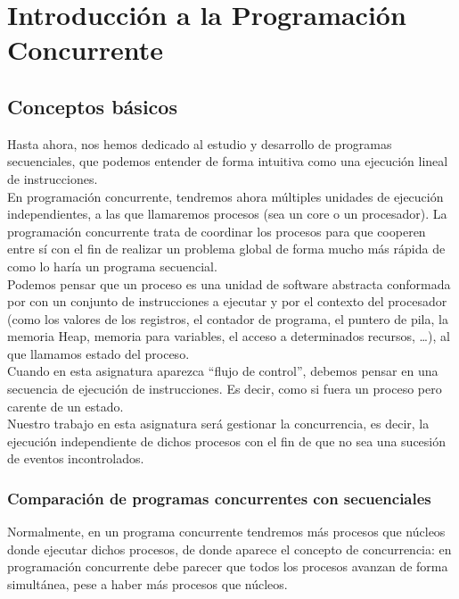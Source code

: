 \chapter{Introducción a la Programación Concurrente}
\section{Conceptos básicos}
Hasta ahora, nos hemos dedicado al estudio y desarrollo de programas secuenciales, que podemos entender de forma intuitiva como una ejecución lineal de instrucciones.\\

En programación concurrente, tendremos ahora múltiples unidades de ejecución independientes, a las que llamaremos procesos (sea un core o un procesador). La programación concurrente trata de coordinar los procesos para que cooperen entre sí con el fin de realizar un problema global de forma mucho más rápida de como lo haría un programa secuencial.\\

Podemos pensar que un proceso es una unidad de software abstracta conformada por con un conjunto de instrucciones a ejecutar y por el contexto del procesador (como los valores de los registros, el contador de programa, el puntero de pila, la memoria Heap, memoria para variables, el acceso a determinados recursos, \ldots), al que llamamos estado del proceso.\\

Cuando en esta asignatura aparezca ``flujo de control'', debemos pensar en una secuencia de ejecución de instrucciones. Es decir, como si fuera un proceso pero carente de un estado.\\

Nuestro trabajo en esta asignatura será gestionar la concurrencia, es decir, la ejecución independiente de dichos procesos con el fin de que no sea una sucesión de eventos incontrolados.

\subsection{Comparación de programas concurrentes con secuenciales}
Normalmente, en un programa concurrente tendremos más procesos que núcleos donde ejecutar dichos procesos, de donde aparece el concepto de concurrencia: en programación concurrente debe parecer que todos los procesos avanzan de forma simultánea, pese a haber más procesos que núcleos.\\

